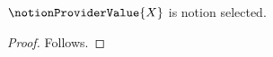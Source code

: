 

\begin{proposition}\label{notion_provider_premise_missing}
    $\notionProviderValue{X}$ is notion selected.
\end{proposition}
\begin{proof}
    Follows.
\end{proof}
